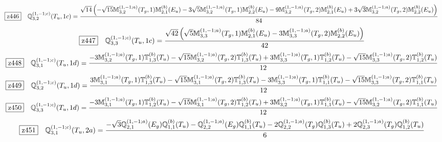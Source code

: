 \documentclass[fleqn,10pt,landscape]{jsarticle}
\begin{document}
\begin{dmath*}
\hspace*{3mm}\fbox{z446}\quad \mathbb{Q}_{3,2}^{(1,-1;c)}(T_{u},1c)=\frac{\sqrt{14} \left(- \sqrt{15} \mathbb{M}_{3,2}^{(1,-1;a)}(T_{g},1) \mathbb{M}_{2,1}^{(b)}(E_{u}) - 3 \sqrt{5} \mathbb{M}_{3,2}^{(1,-1;a)}(T_{g},1) \mathbb{M}_{2,2}^{(b)}(E_{u}) - 9 \mathbb{M}_{3,2}^{(1,-1;a)}(T_{g},2) \mathbb{M}_{2,1}^{(b)}(E_{u}) + 3 \sqrt{3} \mathbb{M}_{3,2}^{(1,-1;a)}(T_{g},2) \mathbb{M}_{2,2}^{(b)}(E_{u})\right)}{84}
\end{dmath*}
\begin{dmath*}
\hspace*{3mm}\fbox{z447}\quad \mathbb{Q}_{3,3}^{(1,-1;c)}(T_{u},1c)=\frac{\sqrt{42} \left(\sqrt{5} \mathbb{M}_{3,3}^{(1,-1;a)}(T_{g},1) \mathbb{M}_{2,1}^{(b)}(E_{u}) - 3 \mathbb{M}_{3,3}^{(1,-1;a)}(T_{g},2) \mathbb{M}_{2,2}^{(b)}(E_{u})\right)}{42}
\end{dmath*}
\begin{dmath*}
\hspace*{3mm}\fbox{z448}\quad \mathbb{Q}_{3,1}^{(1,-1;c)}(T_{u},1d)=\frac{- 3 \mathbb{M}_{3,2}^{(1,-1;a)}(T_{g},1) \mathbb{T}_{1,3}^{(b)}(T_{u}) - \sqrt{15} \mathbb{M}_{3,2}^{(1,-1;a)}(T_{g},2) \mathbb{T}_{1,3}^{(b)}(T_{u}) + 3 \mathbb{M}_{3,3}^{(1,-1;a)}(T_{g},1) \mathbb{T}_{1,2}^{(b)}(T_{u}) - \sqrt{15} \mathbb{M}_{3,3}^{(1,-1;a)}(T_{g},2) \mathbb{T}_{1,2}^{(b)}(T_{u})}{12}
\end{dmath*}
\begin{dmath*}
\hspace*{3mm}\fbox{z449}\quad \mathbb{Q}_{3,2}^{(1,-1;c)}(T_{u},1d)=\frac{3 \mathbb{M}_{3,1}^{(1,-1;a)}(T_{g},1) \mathbb{T}_{1,3}^{(b)}(T_{u}) - \sqrt{15} \mathbb{M}_{3,1}^{(1,-1;a)}(T_{g},2) \mathbb{T}_{1,3}^{(b)}(T_{u}) - 3 \mathbb{M}_{3,3}^{(1,-1;a)}(T_{g},1) \mathbb{T}_{1,1}^{(b)}(T_{u}) - \sqrt{15} \mathbb{M}_{3,3}^{(1,-1;a)}(T_{g},2) \mathbb{T}_{1,1}^{(b)}(T_{u})}{12}
\end{dmath*}
\begin{dmath*}
\hspace*{3mm}\fbox{z450}\quad \mathbb{Q}_{3,3}^{(1,-1;c)}(T_{u},1d)=\frac{- 3 \mathbb{M}_{3,1}^{(1,-1;a)}(T_{g},1) \mathbb{T}_{1,2}^{(b)}(T_{u}) - \sqrt{15} \mathbb{M}_{3,1}^{(1,-1;a)}(T_{g},2) \mathbb{T}_{1,2}^{(b)}(T_{u}) + 3 \mathbb{M}_{3,2}^{(1,-1;a)}(T_{g},1) \mathbb{T}_{1,1}^{(b)}(T_{u}) - \sqrt{15} \mathbb{M}_{3,2}^{(1,-1;a)}(T_{g},2) \mathbb{T}_{1,1}^{(b)}(T_{u})}{12}
\end{dmath*}
\begin{dmath*}
\hspace*{3mm}\fbox{z451}\quad \mathbb{Q}_{3,1}^{(1,-1;c)}(T_{u},2a)=\frac{- \sqrt{3} \mathbb{Q}_{2,1}^{(1,-1;a)}(E_{g}) \mathbb{Q}_{1,1}^{(b)}(T_{u}) - \mathbb{Q}_{2,2}^{(1,-1;a)}(E_{g}) \mathbb{Q}_{1,1}^{(b)}(T_{u}) - 2 \mathbb{Q}_{2,2}^{(1,-1;a)}(T_{g}) \mathbb{Q}_{1,3}^{(b)}(T_{u}) + 2 \mathbb{Q}_{2,3}^{(1,-1;a)}(T_{g}) \mathbb{Q}_{1,2}^{(b)}(T_{u})}{6}
\end{dmath*}
\end{document}
